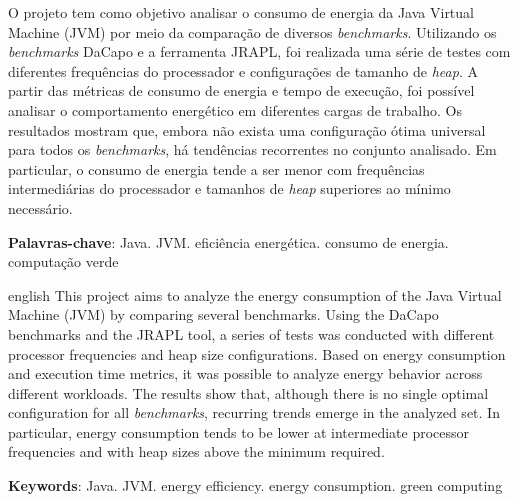 
\setlength{\absparsep}{18pt} %
\begin{resumo}
 O projeto tem como objetivo analisar o consumo de energia da Java Virtual Machine (JVM) por meio da comparação de diversos \textit{benchmarks}. Utilizando os \textit{benchmarks} DaCapo e a ferramenta JRAPL, foi realizada uma série de testes com diferentes frequências do processador e configurações de tamanho de \textit{heap}. A partir das métricas de consumo de energia e tempo de execução, foi possível analisar o comportamento energético em diferentes cargas de trabalho. Os resultados mostram que, embora não exista uma configuração ótima universal para todos os \textit{benchmarks}, há tendências recorrentes no conjunto analisado. Em particular, o consumo de energia tende a ser menor com frequências intermediárias do processador e tamanhos de \textit{heap} superiores ao mínimo necessário.

 \textbf{Palavras-chave}: Java. JVM. eficiência energética. consumo de energia. computação verde
\end{resumo}

\begin{resumo}[Abstract]
 \begin{otherlanguage*}{english}
   This project aims to analyze the energy consumption of the Java Virtual Machine (JVM) by comparing several benchmarks. Using the DaCapo benchmarks and the JRAPL tool, a series of tests was conducted with different processor frequencies and heap size configurations. Based on energy consumption and execution time metrics, it was possible to analyze energy behavior across different workloads. The results show that, although there is no single optimal configuration for all \textit{benchmarks}, recurring trends emerge in the analyzed set. In particular, energy consumption tends to be lower at intermediate processor frequencies and with heap sizes above the minimum required.

   \vspace{\onelineskip}
 
   \noindent 
   \textbf{Keywords}: Java. JVM. energy efficiency. energy consumption. green computing
 \end{otherlanguage*}
\end{resumo}